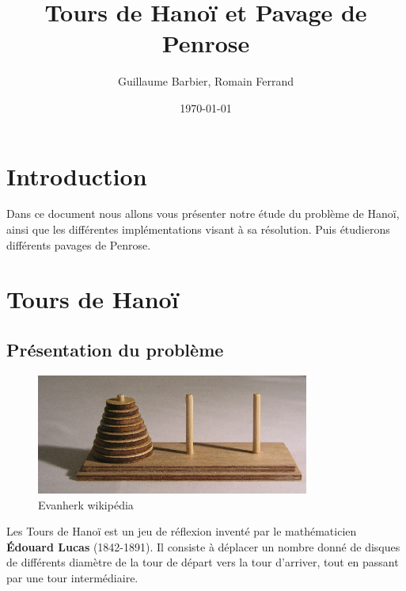 \documentclass[a4paper,11pt]{article}
\begin{document}
\begin{titlepage}
  \title{Tours de Hanoï et Pavage de Penrose}
  \author{Guillaume Barbier, Romain Ferrand}
  \date{\today}

  \maketitle

  \begin{abstract}
    
  \end{abstract}
\end{titlepage}

\section*{Introduction}
\begin{center}
	Dans ce document nous allons vous présenter notre étude du problème de Hanoï,
    ainsi que les différentes implémentations visant à sa résolution.
    Puis étudierons différents pavages de Penrose.
\end{center}

\section{Tours de Hanoï}
\label{chap:hanoi}

\subsection{Présentation du problème}
\label{sec:prezHanoi}
\begin{figure}
  \centering
  \includegraphics[width=0.8\textwidth]{Tower_of_Hanoi.jpeg}
  \caption{Evanherk wikipédia}
  \label{fig:hanoi}
\end{figure}

Les Tours de Hanoï est un jeu de réflexion inventé par le mathématicien \textbf{Édouard Lucas} (1842-1891).
Il consiste à déplacer un nombre donné de disques de différents diamètre de la tour de départ vers la tour d'arriver,
tout en passant par une tour intermédiaire.
\end{document}
